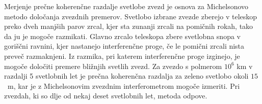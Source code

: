 \begin{remark}
Merjenje prečne koherenčne razdalje svetlobe
zvezd je osnova za Michelsonovo metodo določanja zvezdnih premerov.
Svetlobo izbrane zvezde zberejo v teleskop preko dveh manjših parov
zrcal, kjer sta zunanji zrcali na pomičnih rokah, tako da ju je mogoče
razmikati. Glavno zrcalo teleskopa zbere svetlobna snopa v goriščni
ravnini, kjer nastanejo interferenčne proge, če le pomični zrcali
nista preveč razmaknjeni. Iz razmika, pri katerem interferenčne proge
izginejo, je mogoče določiti premere bližnjih svetlih zvezd. Za zvezdo
s polmerom $10^{6}$ km v razdalji 5 svetlobnih let je prečna koherenčna
razdalja za zeleno svetlobo okoli $15$~m, kar je z Michelsonovim
zvezdnim interferometrom mogoče izmeriti. Pri zvezdah, ki so dlje
od nekaj deset svetlobnih let, metoda odpove.
\end{remark}

